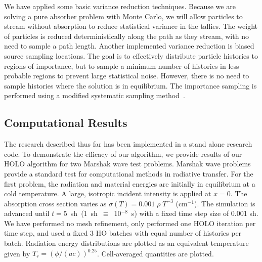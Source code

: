 \documentclass[11pt]{article}
\begin{document}
We have applied some basic variance reduction techniques.
 Because we are solving a pure absorber problem with Monte Carlo, we will allow
particles to stream without absorption to reduce statistical 
variance in the tallies.  The weight of particles is reduced deterministically along
the path as they stream, with no need to sample a path length.  Another implemented 
variance reduction is biased source sampling locations.  The goal is to effectively distribute particle
histories to regions of importance, but to sample a minimum number of histories in
less probable regions to prevent large statistical noise.  However, there is no need
to sample histories where the solution is in equilibrium.
The importance sampling is
performed using a modified
systematic sampling method~\cite{shultis_mc}. 

\subsection{Computational Results}
\label{results}

The research described thus far has been implemented in a stand alone research code.
To demonstrate the efficacy of our algorithm, we provide results of our HOLO
algorithm for two Marshak wave test problems.  Marshak wave problems provide a standard test
for computational methods in radiative transfer.  
For the first problem, the radiation and material energies are initially in
equilibrium at a cold temperature.   A large, isotropic incident intensity is applied
at $x=0$.  The absorption cross section varies as $\sigma(T) = 0.001\;\rho\; T^{-3}$ (cm$^{-1}$).
The simulation is advanced until $t=5$~sh~(1~sh~$\equiv$~10$^{-8}$~s) with a fixed time step size of 0.001 sh. 
We have performed no mesh refinement, only performed one HOLO iteration per time
step, and used a fixed 3 HO batches with equal number of histories per batch. 
Radiation energy distributions are plotted as an equivalent temperature given by
$T_r=(\phi/(ac))^{0.25}$.  Cell-averaged quantities are plotted.
\end{document}
